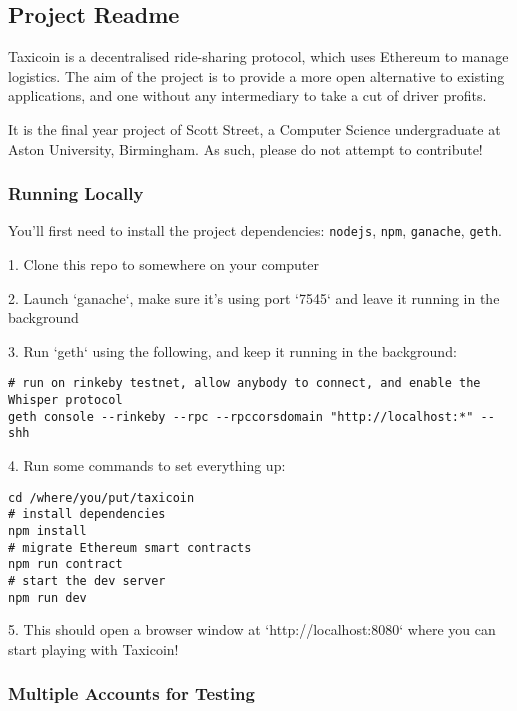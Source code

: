 \subsection*{Project Readme}

Taxicoin is a decentralised ride-sharing protocol, which uses Ethereum to manage logistics. The aim of the project is to provide a more open alternative to existing applications, and one without any intermediary to take a cut of driver profits.

It is the final year project of Scott Street, a Computer Science undergraduate at Aston University, Birmingham. As such, please do not attempt to contribute!

\subsubsection*{Running Locally}

You'll first need to install the project dependencies: \lstinline{nodejs}, \lstinline{npm}, \lstinline{ganache}, \lstinline{geth}.

\medskip

1. Clone this repo to somewhere on your computer

2. Launch `ganache`, make sure it's using port `7545` and leave it running in the background

3. Run `geth` using the following, and keep it running in the background:

\begin{lstlisting}
# run on rinkeby testnet, allow anybody to connect, and enable the Whisper protocol
geth console --rinkeby --rpc --rpccorsdomain "http://localhost:*" --shh
\end{lstlisting}

4. Run some commands to set everything up:

\begin{lstlisting}
cd /where/you/put/taxicoin
# install dependencies
npm install
# migrate Ethereum smart contracts
npm run contract
# start the dev server
npm run dev
\end{lstlisting}

5. This should open a browser window at `http://localhost:8080` where you can start playing with Taxicoin!

\subsubsection*{Multiple Accounts for Testing}


